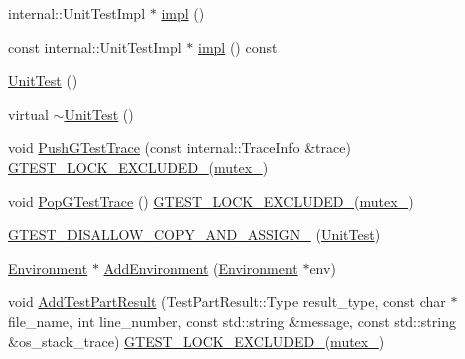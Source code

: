 \begin{DoxyCompactItemize}
\item 
internal\+::\+Unit\+Test\+Impl $\ast$ \mbox{\hyperlink{classtesting_1_1_unit_test_a4df5d11a58affb337d7fa62eaa07690e}{impl}} ()
\item 
const internal\+::\+Unit\+Test\+Impl $\ast$ \mbox{\hyperlink{classtesting_1_1_unit_test_a266a9f49070d1959c1c9d649423879b4}{impl}} () const
\item 
\mbox{\hyperlink{classtesting_1_1_unit_test_a5e646d37f980429c310af696c8775f5c}{Unit\+Test}} ()
\item 
virtual \mbox{\hyperlink{classtesting_1_1_unit_test_a6bbd0cfbacdf8e438f4e422916683c57}{$\sim$\+Unit\+Test}} ()
\item 
void \mbox{\hyperlink{classtesting_1_1_unit_test_af455b953108ff09b3b6e41011653e78a}{Push\+G\+Test\+Trace}} (const internal\+::\+Trace\+Info \&trace) \mbox{\hyperlink{_obj__test_2lib_2googletest-release-1_88_81_2googletest_2include_2gtest_2internal_2gtest-port_8h_a69abff5a4efdd07bd5faebe3dd318d06}{G\+T\+E\+S\+T\+\_\+\+L\+O\+C\+K\+\_\+\+E\+X\+C\+L\+U\+D\+E\+D\+\_\+}}(\mbox{\hyperlink{classtesting_1_1_unit_test_abb94ef45cf0ab43be81ac6d5b1364132}{mutex\+\_\+}})
\item 
void \mbox{\hyperlink{classtesting_1_1_unit_test_a70b3e3282778bc9a36520fe0a8be3c57}{Pop\+G\+Test\+Trace}} () \mbox{\hyperlink{_obj__test_2lib_2googletest-release-1_88_81_2googletest_2include_2gtest_2internal_2gtest-port_8h_a69abff5a4efdd07bd5faebe3dd318d06}{G\+T\+E\+S\+T\+\_\+\+L\+O\+C\+K\+\_\+\+E\+X\+C\+L\+U\+D\+E\+D\+\_\+}}(\mbox{\hyperlink{classtesting_1_1_unit_test_abb94ef45cf0ab43be81ac6d5b1364132}{mutex\+\_\+}})
\item 
\mbox{\hyperlink{classtesting_1_1_unit_test_a1e04cfb4f837cea288a98f2a64c43bba}{G\+T\+E\+S\+T\+\_\+\+D\+I\+S\+A\+L\+L\+O\+W\+\_\+\+C\+O\+P\+Y\+\_\+\+A\+N\+D\+\_\+\+A\+S\+S\+I\+G\+N\+\_\+}} (\mbox{\hyperlink{classtesting_1_1_unit_test}{Unit\+Test}})
\item 
\mbox{\hyperlink{classtesting_1_1_environment}{Environment}} $\ast$ \mbox{\hyperlink{classtesting_1_1_unit_test_a3b64e1255cbd346e0ce40cd3e7a514f7}{Add\+Environment}} (\mbox{\hyperlink{classtesting_1_1_environment}{Environment}} $\ast$env)
\item 
void \mbox{\hyperlink{classtesting_1_1_unit_test_a1d157d2e9a5c1d3405333410c6b13932}{Add\+Test\+Part\+Result}} (Test\+Part\+Result\+::\+Type result\+\_\+type, const char $\ast$file\+\_\+name, int line\+\_\+number, const std\+::string \&message, const std\+::string \&os\+\_\+stack\+\_\+trace) \mbox{\hyperlink{_obj__test_2lib_2googletest-release-1_88_81_2googletest_2include_2gtest_2internal_2gtest-port_8h_a69abff5a4efdd07bd5faebe3dd318d06}{G\+T\+E\+S\+T\+\_\+\+L\+O\+C\+K\+\_\+\+E\+X\+C\+L\+U\+D\+E\+D\+\_\+}}(\mbox{\hyperlink{classtesting_1_1_unit_test_abb94ef45cf0ab43be81ac6d5b1364132}{mutex\+\_\+}})

\end{DoxyCompactItemize}
